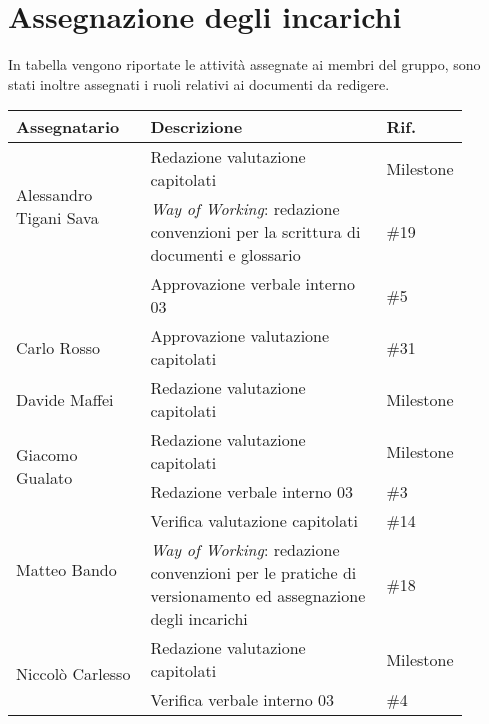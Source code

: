 \section{Assegnazione degli incarichi}
In tabella vengono riportate le attività assegnate ai membri del gruppo, sono stati inoltre assegnati i ruoli relativi ai documenti da redigere.

\begin{center}
    {
    \renewcommand{\arraystretch}{1.5}
    \begin{tabular}{p{0.30\linewidth}|p{0.55\linewidth}|p{0.05\linewidth}}
        \textbf{Assegnatario}                   &   \textbf{Descrizione}                        & \textbf{Rif.}     \\
        \hline
        \multirow{2}{*}{Alessandro Tigani Sava} & Redazione valutazione capitolati              & Milestone	    \\
        \cline{2-3}
                        & \textit{Way of Working}: redazione convenzioni per la scrittura di documenti e glossario & \#19 \\
        \cline{2-3}
        	           	& Approvazione verbale interno 03										& \#5   \\
        \hline 
        Carlo Rosso     & Approvazione valutazione capitolati									& \#31   \\
        \hline
		Davide Maffei	& Redazione valutazione capitolati  			& Milestone \\
        \hline
        \multirow{2}{*}{Giacomo Gualato}        & Redazione valutazione capitolati  			& Milestone \\
        \cline{2-3}
                        & Redazione verbale interno 03											& \#3   \\
        \hline
        \multirow{2}{*}{Matteo Bando}           & Verifica valutazione capitolati   			& \#14  \\
        \cline{2-3}
		& \textit{Way of Working}: redazione convenzioni per le pratiche di versionamento ed assegnazione degli incarichi 				& \#18 \\
        \hline
        \multirow{2}{*}{Niccolò Carlesso}       & Redazione valutazione capitolati  			& Milestone \\
        \cline{2-3}
						& Verifica verbale interno 03											& \#4   \\
    \end{tabular}
    }
    \end{center}
